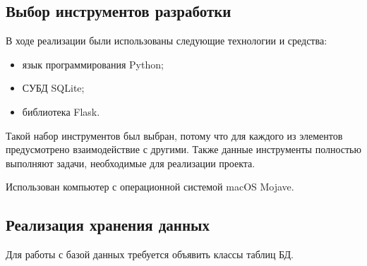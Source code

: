 \subsection{Выбор инструментов разработки}%
\setcounter{subsection}{1}

В ходе реализации были использованы следующие технологии и средства:

\begin{itemize}
	\item язык программирования Python;
	\item СУБД SQLite;
	\item библиотека Flask.
\end{itemize}
 
 Такой набор инструментов был выбран, потому что для каждого из элементов предусмотрено взаимодействие с другими.
 Также данные инструменты полностью выполняют задачи, необходимые для реализации проекта.
 
 Использован компьютер с операционной системой macOS Mojave.

\subsection{Реализация хранения данных}%
\setcounter{subsection}{2}

Для работы с базой данных требуется объявить классы таблиц БД.

